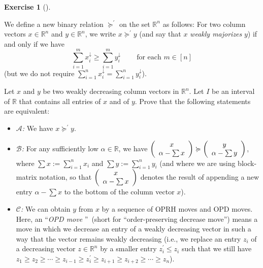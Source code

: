 \documentclass[numbers=enddot,12pt,final,onecolumn,notitlepage]{scrartcl}%
\newcounter{exer}
\numberwithin{exer}{subsection}
\theoremstyle{definition}
\newtheorem{exmp}[exer]{Exercise}
\newenvironment{exercise}[1][]
{\begin{exmp}[#1]\begin{leftbar}}
{\end{leftbar}\end{exmp}}
\let\sumnonlimits\sum
\renewcommand{\sum}{\sumnonlimits\limits}
\begin{document}
\begin{exercise}
\label{exe.major.weakmaj} We define a new binary relation
$\succcurlyeq^{\prime}$ on the set $\mathbb{R}^{n}$ as follows: For two column
vectors $x\in\mathbb{R}^{n}$ and $y\in\mathbb{R}^{n}$, we write $x\succcurlyeq
^{\prime}y$ (and say that $x$ \emph{weakly majorizes} $y$) if and only if we
have%
\[
\sum_{i=1}^{m}x_{i}^{\downarrow}\geq\sum_{i=1}^{m}y_{i}^{\downarrow
}\ \ \ \ \ \ \ \ \ \ \text{for each }m\in\left[  n\right]
\]
(but we do not require $\sum_{i=1}^{n}x_{i}^{\downarrow}=\sum_{i=1}^{n}%
y_{i}^{\downarrow}$).

Let $x$ and $y$ be two weakly decreasing column vectors in $\mathbb{R}^{n}$.
Let $I$ be an interval of $\mathbb{R}$ that contains all entries of $x$ and of
$y$. Prove that the following statements are equivalent:

\begin{itemize}
\item $\mathcal{A}$\textit{:} We have $x\succcurlyeq^{\prime}y$.

\item $\mathcal{B}$\textit{:} For any sufficiently low $\alpha\in\mathbb{R}$,
we have $\left(
\begin{array}
[c]{c}%
x\\
\alpha-\sum x
\end{array}
\right)  \succcurlyeq\left(
\begin{array}
[c]{c}%
y\\
\alpha-\sum y
\end{array}
\right)  $, where $\sum x:=\sum_{i=1}^{n}x_{i}$ and $\sum y:=\sum_{i=1}%
^{n}y_{i}$ (and where we are using block-matrix notation, so that $\left(
\begin{array}
[c]{c}%
x\\
\alpha-\sum x
\end{array}
\right)  $ denotes the result of appending a new entry $\alpha-\sum x$ to the
bottom of the column vector $x$).

\item $\mathcal{C}$\textit{:} We can obtain $y$ from $x$ by a sequence of OPRH
moves and OPD moves. Here, an \textquotedblleft\emph{OPD move}%
\textquotedblright\ (short for \textquotedblleft order-preserving decrease
move\textquotedblright) means a move in which we decrease an entry of a weakly
decreasing vector in such a way that the vector remains weakly decreasing
(i.e., we replace an entry $z_{i}$ of a decreasing vector $z\in\mathbb{R}^{n}$
by a smaller entry $z_{i}^{\prime}\leq z_{i}$ such that we still have
$z_{1}\geq z_{2}\geq\cdots\geq z_{i-1}\geq z_{i}^{\prime}\geq z_{i+1}\geq
z_{i+2}\geq\cdots\geq z_{n}$).


\end{itemize}
\end{exercise}
\end{document}
